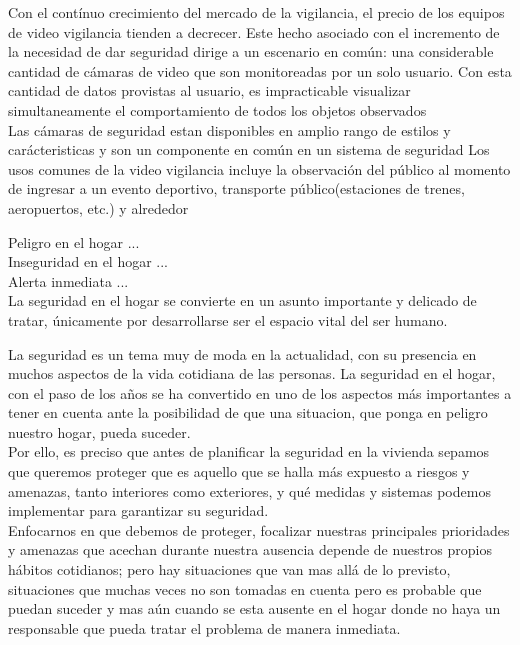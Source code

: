 Con el contínuo crecimiento del mercado de la vigilancia, el precio de los equipos de video vigilancia tienden a decrecer. Este hecho asociado con el incremento de la necesidad de dar seguridad dirige a un escenario en común: una considerable cantidad de cámaras de video que son monitoreadas por un solo usuario. Con esta cantidad de datos provistas al usuario, es impracticable visualizar simultaneamente el comportamiento de todos los objetos observados\\

Las cámaras de seguridad estan disponibles en amplio rango de estilos y carácteristicas y son un componente en común en un sistema de seguridad
Los usos comunes de la video vigilancia incluye la observación del público al momento de ingresar a un evento deportivo, transporte público(estaciones de trenes, aeropuertos, etc.) y alrededor


Peligro en el hogar ...\\

Inseguridad en el hogar ...\\

Alerta inmediata ...\\

La seguridad en el hogar se convierte en un asunto importante y delicado de tratar, únicamente por desarrollarse ser el espacio vital del ser humano. 

La seguridad es un tema muy de moda en la actualidad, con su presencia en muchos aspectos de la vida cotidiana de las personas. La seguridad en el hogar, con el paso de los años se ha convertido en  uno de los aspectos más importantes a tener en cuenta ante la posibilidad de que una situacion, que ponga en  peligro nuestro hogar, pueda suceder.\\

Por ello, es preciso que antes de planificar la seguridad en la vivienda sepamos que queremos proteger que es aquello que se halla más expuesto a riesgos y amenazas, tanto interiores como exteriores,  y qué medidas y sistemas podemos implementar para garantizar su seguridad. \\

Enfocarnos en que debemos de proteger, focalizar nuestras principales prioridades y amenazas que acechan durante nuestra ausencia depende de nuestros propios hábitos cotidianos; pero hay situaciones que van mas allá de lo previsto, situaciones que muchas veces no son tomadas en cuenta pero es probable que puedan suceder y mas aún cuando se esta ausente en el hogar donde no haya un responsable que pueda tratar el problema de manera inmediata.\\

